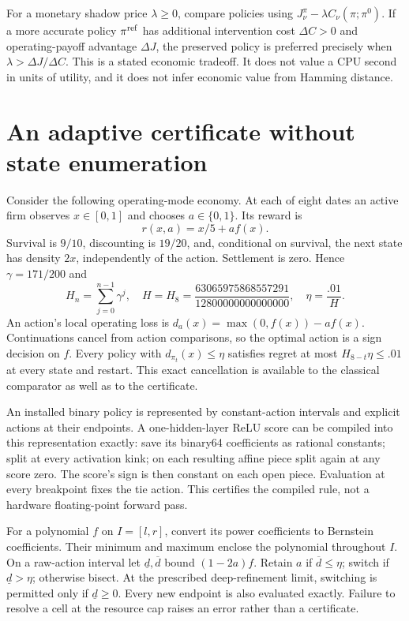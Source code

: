 For a monetary shadow price $\lambda\ge0$, compare policies using $J_\nu^\pi-\lambda C_\nu(\pi;\pi^0)$. If a more accurate policy $\pi^{\rm ref}$ has additional intervention cost $\Delta C>0$ and operating-payoff advantage $\Delta J$, the preserved policy is preferred precisely when $\lambda>\Delta J/\Delta C$. This is a stated economic tradeoff. It does not value a CPU second in units of utility, and it does not infer economic value from Hamming distance.

\section{An adaptive certificate without state enumeration}\label{sec:complexity30}
Consider the following operating-mode economy. At each of eight dates an active firm observes $x\in[0,1]$ and chooses $a\in\{0,1\}$. Its reward is
\begin{equation}
 r(x,a)=x/5+a f(x).
\end{equation}
Survival is $9/10$, discounting is $19/20$, and, conditional on survival, the next state has density $2x$, independently of the action. Settlement is zero. Hence $\gamma=171/200$ and
\begin{equation}
 H_n=\sum_{j=0}^{n-1}\gamma^j,\quad H=H_8=\frac{63065975868557291}{12800000000000000},\quad
 \eta=\frac{.01}{H}.
\end{equation}
An action's local operating loss is $d_a(x)=\max(0,f(x))-a f(x)$. Continuations cancel from action comparisons, so the optimal action is a sign decision on $f$. Every policy with $d_{\pi_t}(x)\le\eta$ satisfies regret at most $H_{8-t}\eta\le .01$ at every state and restart. This exact cancellation is available to the classical comparator as well as to the certificate.

An installed binary policy is represented by constant-action intervals and explicit actions at their endpoints. A one-hidden-layer ReLU score can be compiled into this representation exactly: save its binary64 coefficients as rational constants; split at every activation kink; on each resulting affine piece split again at any score zero. The score's sign is then constant on each open piece. Evaluation at every breakpoint fixes the tie action. This certifies the compiled rule, not a hardware floating-point forward pass.

For a polynomial $f$ on $I=[l,r]$, convert its power coefficients to Bernstein coefficients. Their minimum and maximum enclose the polynomial throughout $I$. On a raw-action interval let $\underline d,\overline d$ bound $(1-2a)f$. Retain $a$ if $\overline d\le\eta$; switch if $\underline d>\eta$; otherwise bisect. At the prescribed deep-refinement limit, switching is permitted only if $\underline d\ge0$. Every new endpoint is also evaluated exactly. Failure to resolve a cell at the resource cap raises an error rather than a certificate.

